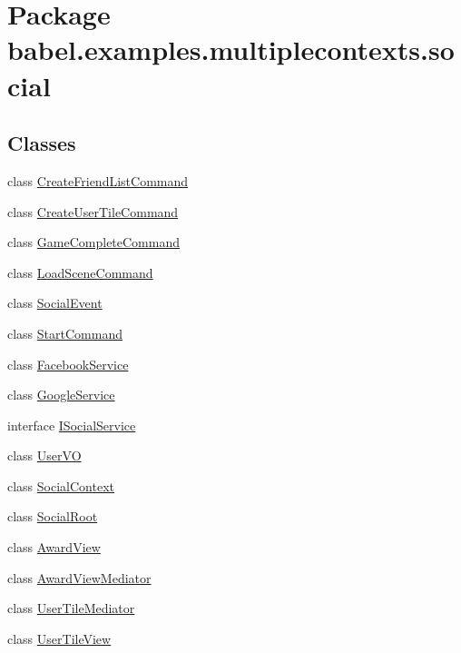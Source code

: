 \hypertarget{namespacebabel_1_1examples_1_1multiplecontexts_1_1social}{\section{Package babel.\-examples.\-multiplecontexts.\-social}
\label{namespacebabel_1_1examples_1_1multiplecontexts_1_1social}
}
\subsection*{Classes}
\begin{DoxyCompactItemize}
\item 
class \hyperlink{classbabel_1_1examples_1_1multiplecontexts_1_1social_1_1_create_friend_list_command}{Create\-Friend\-List\-Command}
\item 
class \hyperlink{classbabel_1_1examples_1_1multiplecontexts_1_1social_1_1_create_user_tile_command}{Create\-User\-Tile\-Command}
\item 
class \hyperlink{classbabel_1_1examples_1_1multiplecontexts_1_1social_1_1_game_complete_command}{Game\-Complete\-Command}
\item 
class \hyperlink{classbabel_1_1examples_1_1multiplecontexts_1_1social_1_1_load_scene_command}{Load\-Scene\-Command}
\item 
class \hyperlink{classbabel_1_1examples_1_1multiplecontexts_1_1social_1_1_social_event}{Social\-Event}
\item 
class \hyperlink{classbabel_1_1examples_1_1multiplecontexts_1_1social_1_1_start_command}{Start\-Command}
\item 
class \hyperlink{classbabel_1_1examples_1_1multiplecontexts_1_1social_1_1_facebook_service}{Facebook\-Service}
\item 
class \hyperlink{classbabel_1_1examples_1_1multiplecontexts_1_1social_1_1_google_service}{Google\-Service}
\item 
interface \hyperlink{interfacebabel_1_1examples_1_1multiplecontexts_1_1social_1_1_i_social_service}{I\-Social\-Service}
\item 
class \hyperlink{classbabel_1_1examples_1_1multiplecontexts_1_1social_1_1_user_v_o}{User\-V\-O}
\item 
class \hyperlink{classbabel_1_1examples_1_1multiplecontexts_1_1social_1_1_social_context}{Social\-Context}
\item 
class \hyperlink{classbabel_1_1examples_1_1multiplecontexts_1_1social_1_1_social_root}{Social\-Root}
\item 
class \hyperlink{classbabel_1_1examples_1_1multiplecontexts_1_1social_1_1_award_view}{Award\-View}
\item 
class \hyperlink{classbabel_1_1examples_1_1multiplecontexts_1_1social_1_1_award_view_mediator}{Award\-View\-Mediator}
\item 
class \hyperlink{classbabel_1_1examples_1_1multiplecontexts_1_1social_1_1_user_tile_mediator}{User\-Tile\-Mediator}
\item 
class \hyperlink{classbabel_1_1examples_1_1multiplecontexts_1_1social_1_1_user_tile_view}{User\-Tile\-View}
\end{DoxyCompactItemize}
